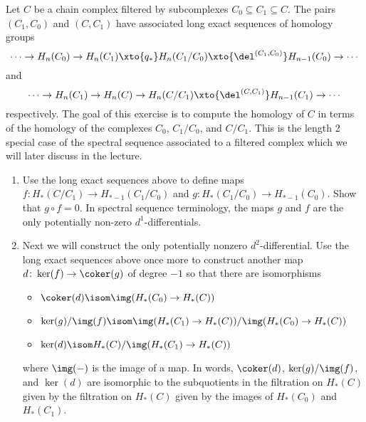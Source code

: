 \begin{exercise}
	Let $C$ be a chain complex filtered by subcomplexes $C_0 \subseteq C_1 \subseteq C$.
	The pairs $(C_1, C_0)$ and $(C, C_1)$ have associated long exact sequences of homology groups
	\begin{equation}\label{ex2:les1}
		\cdots \to H_n(C_0) \to H_n(C_1) \xto{q_*} H_n(C_1 / C_0) \xto{\del^{(C_1, C_0)}} H_{n - 1}(C_0) \to \cdots
	\end{equation}
	and 
	\begin{equation}\label{ex2:les2}
		\cdots \to H_n(C_1) \to H_n(C) \to H_n(C / C_1) \xto{\del^{(C, C_1)}} H_{n - 1}(C_1) \to \cdots
	\end{equation}
	respectively.
	The goal of this exercise is to compute the homology of $C$ in terms of the homology of the complexes $C_0$, $C_1 / C_0$, and $C / C_1$.
	This is the length 2 special case of the spectral sequence associated to a filtered complex which we will later discuss in the lecture.
	\begin{enumerate}
		\item Use the long exact sequences above to define maps $f\colon H_*(C / C_1) \to H_{* - 1}(C_1 / C_0)$ and $g\colon H_*(C_1 / C_0) \to H_{* - 1}(C_0)$.
			Show that $g \circ f = 0$.
			In spectral sequence terminology, the maps $g$ and $f$ are the only potentially non-zero $d^1$-differentials.
		\item Next we will construct the only potentially nonzero $d^2$-differential.
			Use the long exact sequences above once more to construct another map $d\colon \ker(f) \to \coker(g)$ of degree $-1$ so that there are isomorphisms
			\begin{itemize}
				\item $\coker(d) \isom \img(H_*(C_0) \to H_*(C))$
				\item $\ker(g) / \img(f) \isom \img(H_*(C_1) \to H_*(C)) / \img(H_*(C_0) \to H_*(C))$
				\item $\ker(d) \isom H_*(C) / \img(H_*(C_1) \to H_*(C))$
			\end{itemize}
			where $\img({{-}})$ is the image of a map.
			In words, $\coker(d)$, $\ker(g) / \img(f)$, and $\ker(d)$ are isomorphic to the subquotients in the filtration on $H_*(C)$ given by the filtration on $H_*(C)$ given by the images of $H_*(C_0)$ and $H_*(C_1)$.
	\end{enumerate}
\end{exercise}
